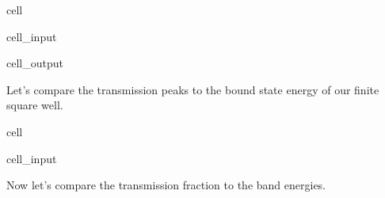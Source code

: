 \documentclass[letterpaper,10pt,english]{jupyterBook}
\begin{document}
\begin{sphinxuseclass}{cell}
\begin{sphinxVerbatimInput}
\begin{sphinxuseclass}{cell_input}
\begin{sphinxVerbatim}[commandchars=\\\{\}]
   
  
\end{sphinxVerbatim}

\end{sphinxuseclass}\end{sphinxVerbatimInput}
\begin{sphinxVerbatimOutput}

\begin{sphinxuseclass}{cell_output}
\noindent{}

\end{sphinxuseclass}\end{sphinxVerbatimOutput}

\end{sphinxuseclass}
\sphinxAtStartPar
Let’s compare the transmission peaks to the bound state energy of our finite square well.

\begin{sphinxuseclass}{cell}\begin{sphinxVerbatimInput}

\begin{sphinxuseclass}{cell_input}
\begin{sphinxVerbatim}[commandchars=\\\{\}]
     
    


   
\end{sphinxVerbatim}

\end{sphinxuseclass}\end{sphinxVerbatimInput}

\end{sphinxuseclass}
\sphinxAtStartPar
Now let’s compare the transmission fraction to the band energies.
\end{document}
